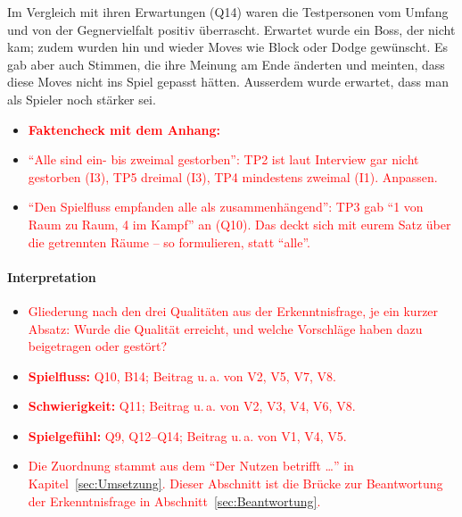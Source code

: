\documentclass[../Main.tex]{subfiles}
\begin{document}
Im Vergleich mit ihren Erwartungen (Q14) waren die Testpersonen vom Umfang und von der Gegnervielfalt positiv überrascht. Erwartet wurde ein Boss, der nicht kam; zudem wurden hin und wieder Moves wie Block oder Dodge gewünscht. Es gab aber auch Stimmen, die ihre Meinung am Ende änderten und meinten, dass diese Moves nicht ins Spiel gepasst hätten. Ausserdem wurde erwartet, dass man als Spieler noch stärker sei.

\begin{itemize}[leftmargin=1.5cm]
    \item \textcolor{red}{\textbf{Faktencheck mit dem Anhang:}}
    \item \textcolor{red}{\enquote{Alle sind ein- bis zweimal gestorben}: TP2 ist laut Interview gar nicht gestorben (I3), TP5 dreimal (I3), TP4 mindestens zweimal (I1). Anpassen.}
    \item \textcolor{red}{\enquote{Den Spielfluss empfanden alle als zusammenhängend}: TP3 gab \enquote{1 von Raum zu Raum, 4 im Kampf} an (Q10). Das deckt sich mit eurem Satz über die getrennten Räume -- so formulieren, statt \enquote{alle}.}
\end{itemize}

\paragraph{Interpretation}
\begin{itemize}[leftmargin=1.5cm]
    \item \textcolor{red}{Gliederung nach den drei Qualitäten aus der Erkenntnisfrage, je ein kurzer Absatz: Wurde die Qualität erreicht, und welche Vorschläge haben dazu beigetragen oder gestört?}
    \item \textcolor{red}{\textbf{Spielfluss:} Q10, B14; Beitrag u.\,a. von V2, V5, V7, V8.}
    \item \textcolor{red}{\textbf{Schwierigkeit:} Q11; Beitrag u.\,a. von V2, V3, V4, V6, V8.}
    \item \textcolor{red}{\textbf{Spielgefühl:} Q9, Q12--Q14; Beitrag u.\,a. von V1, V4, V5.}
    \item \textcolor{red}{Die Zuordnung stammt aus dem \enquote{Der Nutzen betrifft \ldots} in Kapitel~\ref{sec:Umsetzung}. Dieser Abschnitt ist die Brücke zur Beantwortung der Erkenntnisfrage in Abschnitt~\ref{sec:Beantwortung}.}
\end{itemize}
\end{document}
